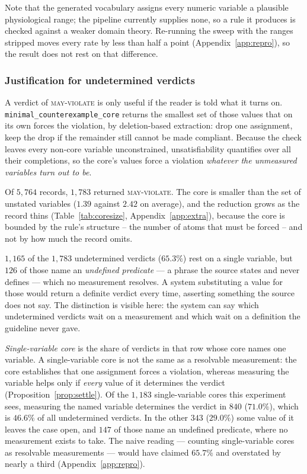 \documentclass{article}
\begin{document}
Note that the generated vocabulary assigns every numeric variable a plausible
physiological range; the pipeline currently supplies none, so a rule it
produces is checked against a weaker domain theory. Re-running the sweep with
the ranges stripped moves every rate by less than half a point
(Appendix~\ref{app:repro}), so the result does not rest on that difference.

\subsubsection{Justification for undetermined verdicts}
\label{sec:may}

A verdict of \textsc{may-violate} is only useful if the reader is told what it
turns on. \texttt{minimal\_counterexample\_core} returns the smallest set of those values that on its own forces the violation, by deletion-based extraction: drop one assignment, keep the drop if the remainder still cannot be made compliant. Because the check leaves every non-core variable unconstrained, unsatisfiability quantifies over all their completions, so the core's values force a violation \emph{whatever the unmeasured variables turn out to be}.

Of $5{,}764$ records, $1{,}783$ returned \textsc{may-violate}. The core is smaller than the set of unstated variables ($1.39$ against $2.42$ on average), and the reduction grows as the record thins (Table~\ref{tab:coresize}, Appendix~\ref{app:extra}), because the core is bounded by the rule's structure -- the number of atoms that must be forced -- and not by how much the record omits.


$1{,}165$ of the $1{,}783$ undetermined verdicts ($65.3\%$) rest on a single
variable, but $126$ of those name an \emph{undefined predicate} --- a phrase the
source states and never defines --- which no measurement resolves. A system
substituting a value for those would return a definite verdict every time,
asserting something the source does not say. The distinction is visible here:
the system can say which undetermined verdicts wait on a measurement and which
wait on a definition the guideline never gave.

\emph{Single-variable core} is the share of verdicts in that row
  whose core names one variable. A single-variable core is not the same as a resolvable measurement: the core establishes that one assignment forces a violation, whereas measuring the variable helps only if \emph{every} value of it determines the verdict (Proposition~\ref{prop:settle}). Of the $1{,}183$ single-variable cores this experiment sees, measuring the named
variable determines the verdict in $840$ ($71.0\%$), which is $46.6\%$ of all
undetermined verdicts. In the other $343$ ($29.0\%$) some value of it leaves the
case open, and $147$ of those name an undefined predicate, where no measurement
exists to take. The naive reading --- counting single-variable cores as
resolvable measurements --- would have claimed $65.7\%$ and overstated by nearly
a third (Appendix~\ref{app:repro}). 
\end{document}
